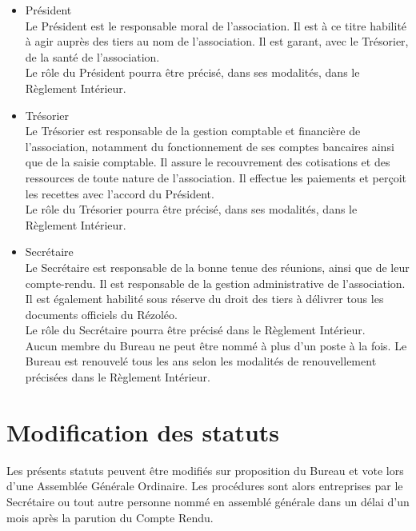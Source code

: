 \documentclass[12pt]{constitution}
\begin{document}
	\begin{itemize}
		\item[\textbullet] Président\\
		 Le Président est le responsable moral de l'association. Il est à ce titre habilité à agir auprès des tiers au nom de l'association. Il est garant, avec le Trésorier, de la santé de l'association.\\
		Le rôle du Président pourra être précisé, dans ses modalités, dans le Règlement Intérieur.
		\item[\textbullet] Trésorier\\
		Le Trésorier est responsable de la gestion comptable et financière de l'association, notamment du fonctionnement de ses comptes bancaires ainsi que de la saisie comptable. Il assure le recouvrement des cotisations et des ressources de toute nature de l'association. Il effectue les paiements et perçoit les recettes avec l'accord du Président.\\
		Le rôle du Trésorier pourra être précisé, dans ses modalités, dans le Règlement Intérieur.

		\item[\textbullet] Secrétaire\\
		Le Secrétaire est responsable de la bonne tenue des réunions, ainsi que de leur compte-rendu. Il est responsable de la gestion administrative de l'association. Il est également habilité sous réserve du droit des tiers à délivrer tous les documents officiels du Rézoléo.\\
		Le rôle du Secrétaire pourra être précisé dans le Règlement Intérieur.\\

		Aucun membre du Bureau ne peut être nommé à plus d'un poste à la fois. Le Bureau est renouvelé tous les ans selon les modalités de renouvellement précisées dans le Règlement Intérieur.
	\end{itemize}


	\section{Modification des statuts}
	Les présents statuts peuvent être modifiés sur proposition du Bureau et vote lors d'une Assemblée Générale Ordinaire.
	Les procédures sont alors entreprises par le Secrétaire ou tout autre personne nommé en assemblé générale dans un délai d'un mois après la parution du Compte Rendu.
\end{document}
